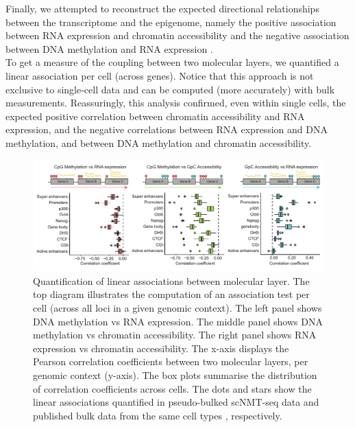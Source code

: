Finally, we attempted to reconstruct the expected directional relationships between the transcriptome and the epigenome, namely the positive association between RNA expression and chromatin accessibility and the negative association between DNA methylation and RNA expression \cite{Thurman2012,Angermueller2016}.\\
To get a measure of the coupling between two molecular layers, we quantified a linear association per cell (across genes). Notice that this approach is not exclusive to single-cell data and can be computed (more accurately) with bulk measurements. Reassuringly, this analysis confirmed, even within single cells, the expected positive correlation between chromatin accessibility and RNA expression, and the negative correlations between RNA expression and DNA methylation, and between DNA methylation and chromatin accessibility.

\begin{figure}[H]
	\centering
	\includegraphics[width=1.0\linewidth]{scNMT_correlations_acrossgenes}
	\caption[]{Quantification of linear associations between molecular layer. The top diagram illustrates the computation of an association test per cell (across all loci in a given genomic context). The left panel shows DNA methylation vs RNA expression. The middle panel shows DNA methylation vs chromatin accessibility. The right panel shows RNA expression vs chromatin accessibility. The x-axis displays the Pearson correlation coefficients between two molecular layers, per genomic context (y-axis). The box plots summarise the distribution of correlation coefficients across cells. The dots and stars show the linear associations quantified in pseudo-bulked scNMT-seq data and published bulk data from the same cell types \cite{Ficz2013,ENCODE2012}, respectively. }
	\label{fig:scNMT_correlations_acrossgenes}
\end{figure}


